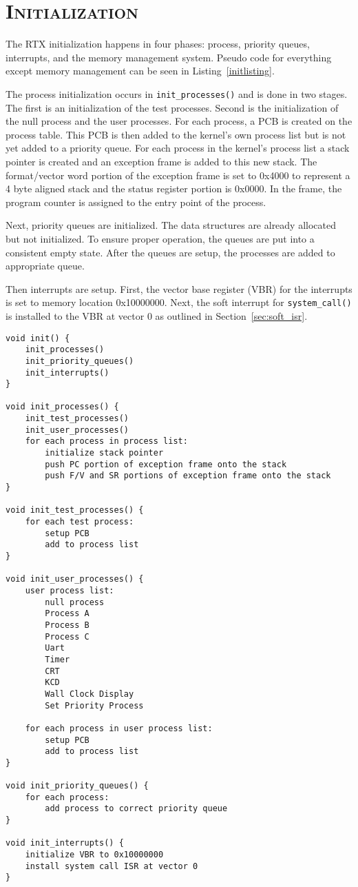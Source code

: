 \documentclass[oneside]{report}
\begin{document}
\section{\textsc{Initialization}}
\label{sec:rtx_init}
The RTX initialization happens in four phases: process, priority queues, 
interrupts, and the memory management system. Pseudo code for everything except
memory management can be seen in Listing~\ref{initlisting}.

The process initialization occurs in \texttt{init\_processes()} and is done in
two stages. The first is an initialization of the test processes. Second is the
initialization of the null process and the user processes. For each process, a
PCB is created on the process table. This PCB is then added to the kernel's own
process list but is not yet added to a priority queue. For each process in
the kernel's process list a stack pointer is created and an exception frame is
added to this new stack. The format/vector word portion of the exception frame
is set to 0x4000 to represent a 4 byte aligned stack and the status register
portion is 0x0000. In the frame, the program counter is assigned to the entry
point of the process.

Next, priority queues are initialized. The data structures are already
allocated but not initialized. To ensure proper operation, the queues are
put into a consistent empty state. After the queues are setup, the processes
are added to appropriate queue.

Then interrupts are setup. First, the vector base register (VBR) for the
interrupts is set to memory location 0x10000000. Next, the soft interrupt for
\texttt{system\_call()} is installed to the VBR at vector 0 as outlined in
Section~\ref{sec:soft_isr}.

\begin{lstlisting}
void init() {
    init_processes()
    init_priority_queues()
    init_interrupts()
}

void init_processes() {
    init_test_processes()
    init_user_processes()
    for each process in process list:
        initialize stack pointer
        push PC portion of exception frame onto the stack
        push F/V and SR portions of exception frame onto the stack
}

void init_test_processes() {
    for each test process: 
        setup PCB
        add to process list
}

void init_user_processes() {
    user process list:
        null process
        Process A
        Process B
        Process C
        Uart
        Timer
        CRT
        KCD
        Wall Clock Display
        Set Priority Process

    for each process in user process list:
        setup PCB
        add to process list
}

void init_priority_queues() {
    for each process: 
        add process to correct priority queue
}

void init_interrupts() {
    initialize VBR to 0x10000000
    install system call ISR at vector 0
}
\end{lstlisting}
\end{document}
